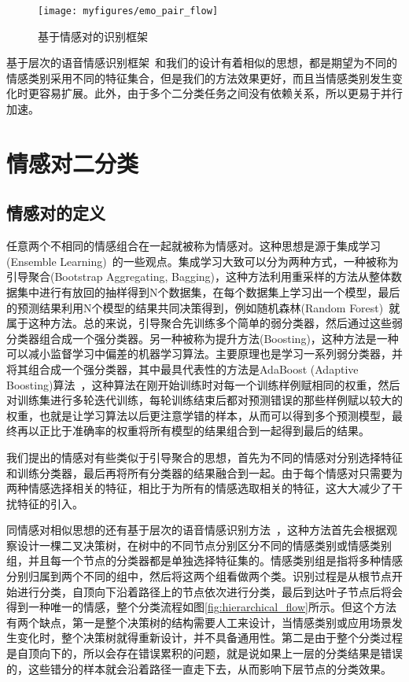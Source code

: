 \begin{figure}[htb] %
    \vspace{-0.8cm}  %
    \setlength{\belowcaptionskip}{0cm}   %
    \centering
    \texttt{[image: myfigures/emo\_pair\_flow]}
    \caption{基于情感对的识别框架}
    \label{fig:emo_pair_flow}
\end{figure}

基于层次的语音情感识别框架~\cite{Lee2009Emotion}和我们的设计有着相似的思想，都是期望为不同的情感类别采用不同的特征集合，但是我们的方法效果更好，而且当情感类别发生变化时更容易扩展。此外，由于多个二分类任务之间没有依赖关系，所以更易于并行加速。

\section{情感对二分类}
\label{sec:emo_pair}

\subsection{情感对的定义}
\label{ssec:emo_pair_def}
任意两个不相同的情感组合在一起就被称为情感对。这种思想是源于集成学习(Ensemble Learning)~\cite{Liu1999Ensemble}的一些观点。集成学习大致可以分为两种方式，一种被称为引导聚合(Bootstrap Aggregating, Bagging)，这种方法利用重采样的方法从整体数据集中进行有放回的抽样得到N个数据集，在每个数据集上学习出一个模型，最后的预测结果利用N个模型的结果共同决策得到，例如随机森林(Random Forest)~\cite{Liaw2002Classification}就属于这种方法。总的来说，引导聚合先训练多个简单的弱分类器，然后通过这些弱分类器组合成一个强分类器。另一种被称为提升方法(Boosting)，这种方法是一种可以减小监督学习中偏差的机器学习算法。主要原理也是学习一系列弱分类器，并将其组合成一个强分类器，其中最具代表性的方法是AdaBoost (Adaptive Boosting)算法~\cite{Ratsch2001Soft}，这种算法在刚开始训练时对每一个训练样例赋相同的权重，然后对训练集进行多轮迭代训练，每轮训练结束后都对预测错误的那些样例赋以较大的权重，也就是让学习算法以后更注意学错的样本，从而可以得到多个预测模型，最终再以正比于准确率的权重将所有模型的结果组合到一起得到最后的结果。

我们提出的情感对有些类似于引导聚合的思想，首先为不同的情感对分别选择特征和训练分类器，最后再将所有分类器的结果融合到一起。由于每个情感对只需要为两种情感选择相关的特征，相比于为所有的情感选取相关的特征，这大大减少了干扰特征的引入。

同情感对相似思想的还有基于层次的语音情感识别方法~\cite{Lee2009Emotion}，这种方法首先会根据观察设计一棵二叉决策树，在树中的不同节点分别区分不同的情感类别或情感类别组，并且每一个节点的分类器都是单独选择特征集的。情感类别组是指将多种情感分别归属到两个不同的组中，然后将这两个组看做两个类。识别过程是从根节点开始进行分类，自顶向下沿着路径上的节点依次进行分类，最后到达叶子节点后将会得到一种唯一的情感，整个分类流程如图\ref{fig:hierarchical_flow}所示。但这个方法有两个缺点，第一是整个决策树的结构需要人工来设计，当情感类别或应用场景发生变化时，整个决策树就得重新设计，并不具备通用性。第二是由于整个分类过程是自顶向下的，所以会存在错误累积的问题，就是说如果上一层的分类结果是错误的，这些错分的样本就会沿着路径一直走下去，从而影响下层节点的分类效果。

